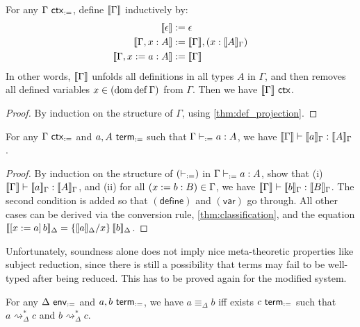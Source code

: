 \documentclass[twoside]{report}
\begin{document}
\begin{proposition}
\label{thm:def_ctx_projection}
For any $\Gamma \ctxd$, define $\inter{\Gamma}$ inductively by:
$$
\begin{aligned}
    \inter{\epsilon} &\defeq \epsilon \\
    \inter{\Gamma, x : A} &\defeq \inter{\Gamma}, (x : \inter{A}_\Gamma) \\
    \inter{\Gamma, x \defeq a : A} &\defeq \inter{\Gamma} \\
\end{aligned}
$$
In other words, $\inter{\Gamma}$ unfolds all definitions in all types $A$ in $\Gamma$, and then removes all defined variables $x \in (\dom \defn \Gamma)$ from $\Gamma$. Then we have $\inter{\Gamma} \ctxo$.
\end{proposition}

\begin{proof}
By induction on the structure of $\Gamma$, using \cref{thm:def_projection}.
\end{proof}

\begin{proposition}[Soundness]
\label{thm:def_soundness}
For any $\Gamma \ctxd$ and $a, A \termd$ such that $\Gamma \vdashd a : A$, we have $\inter{\Gamma} \vdasho \inter{a}_\Gamma : \inter{A}_\Gamma$.
\end{proposition}

\begin{proof}
By induction on the structure of $(\vdashd)$ in $\Gamma \vdashd a : A$, show that (i) $\inter{\Gamma} \vdasho \inter{a}_\Gamma : \inter{A}_\Gamma$, and (ii) for all $(x \defeq b : B) \in \Gamma$, we have $\inter{\Gamma} \vdasho \inter{b}_\Gamma : \inter{B}_\Gamma$. The second condition is added so that $(\mathsf{define})$ and $(\mathsf{var})$ go through. All other cases can be derived via the conversion rule, \cref{thm:classification}, and the equation $\inter{\llet x a b}_\Delta = \subst x {\inter{a}_\Delta} {\inter{b}_\Delta}$.
\end{proof}

Unfortunately, soundness alone does not imply nice meta-theoretic properties like subject reduction, since there is still a possibility that terms may fail to be well-typed after being reduced. This has to be proved again for the modified system.

\begin{proposition}
\label{thm:def_characterisation_of_defeq}
For any $\Delta \envd$ and $a, b \termd$, we have $a \equiv_\Delta b$ iff exists $c \termd$ such that $a\rightsquigarrow_\Delta^\ast c$ and $b\rightsquigarrow_\Delta^\ast c$.
\end{proposition}
\end{document}
